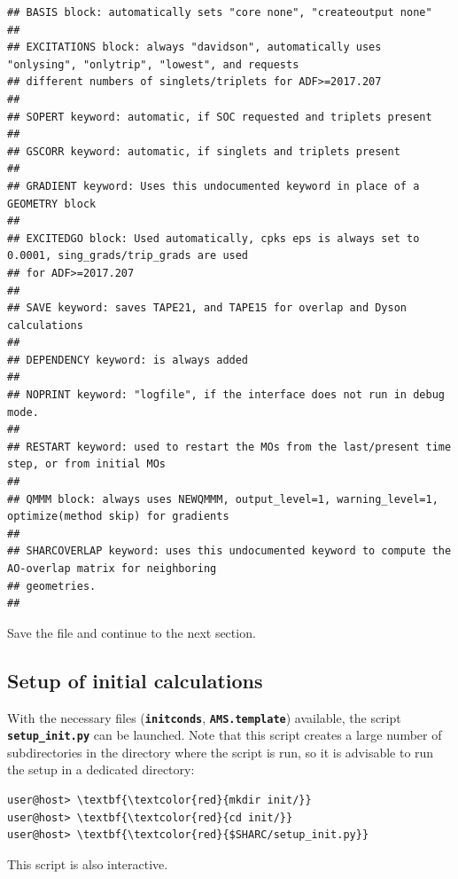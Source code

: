 \documentclass[a4paper,11pt,DIV=15,openany]{scrbook}
\makeatletter
\newcommand{\refermanual}[2][rectangle,draw=B,thick,fill=black!5,inner sep=1pt,outer sep=0pt,rounded corners]{\marginpar{\tikz[baseline=(current bounding box.north)]\node at (0,0) [#1]{\begin{tabular}{@{}l@{}}See\\ section\\ \ref*{#2}\\ (p. \pageref*{#2})\\ in the\\ manual.\end{tabular}};}}
\newcommand{\ttt}[1]{\textbf{\texttt{#1}}}
\makeatother
\begin{document}
\begin{oframed}
\begin{Verbatim}[commandchars=\\\{\}]
## BASIS block: automatically sets "core none", "createoutput none"
##
## EXCITATIONS block: always "davidson", automatically uses "onlysing", "onlytrip", "lowest", and requests 
## different numbers of singlets/triplets for ADF>=2017.207
##
## SOPERT keyword: automatic, if SOC requested and triplets present
##
## GSCORR keyword: automatic, if singlets and triplets present
##
## GRADIENT keyword: Uses this undocumented keyword in place of a GEOMETRY block
##
## EXCITEDGO block: Used automatically, cpks eps is always set to 0.0001, sing_grads/trip_grads are used 
## for ADF>=2017.207
##
## SAVE keyword: saves TAPE21, and TAPE15 for overlap and Dyson calculations
##
## DEPENDENCY keyword: is always added
##
## NOPRINT keyword: "logfile", if the interface does not run in debug mode.
##
## RESTART keyword: used to restart the MOs from the last/present time step, or from initial MOs
##
## QMMM block: always uses NEWQMMM, output_level=1, warning_level=1, optimize(method skip) for gradients
##
## SHARCOVERLAP keyword: uses this undocumented keyword to compute the AO-overlap matrix for neighboring 
## geometries.
##
\end{Verbatim}
\end{oframed}

\normalsize
Save the file and continue to the next section.

\clearpage
\subsection{Setup of initial calculations}
\refermanual{m-sec:molcas_input.py}

With the necessary files (\ttt{initconds}, \ttt{AMS.template}) available, the script \ttt{setup\_init.py} can be launched.
Note that this script creates a large number of subdirectories in the directory where the script is run, so it is advisable to run the setup in a dedicated directory:
\begin{Verbatim}[commandchars=\\\{\}]
user@host> \textbf{\textcolor{red}{mkdir init/}}
user@host> \textbf{\textcolor{red}{cd init/}}
user@host> \textbf{\textcolor{red}{$SHARC/setup_init.py}}
\end{Verbatim}
This script is also interactive. 
\end{document}
